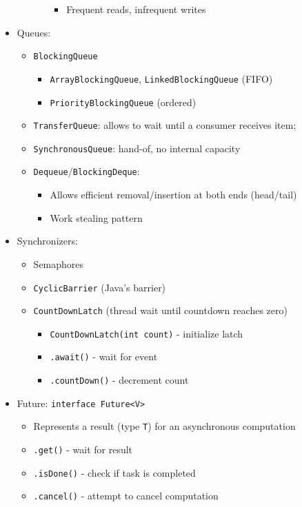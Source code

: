 \documentclass[a4paper]{article}
\newcommand{\inline}[1]{\lstinline!#1!}%
\begin{document}
\begin{itemize}
\begin{itemize}
\begin{itemize}
\begin{itemize}
\item Frequent reads, infrequent writes
\end{itemize}
\end{itemize}
\end{itemize}
\item Queues: 
\begin{itemize}
\item \inline{BlockingQueue}
\begin{itemize}
\item \inline{ArrayBlockingQueue}, \inline{LinkedBlockingQueue} (FIFO)
\item \inline{PriorityBlockingQueue} (ordered)
\end{itemize}
\item \inline{TransferQueue}: allows to wait until a consumer receives item; 
\item \inline{SynchronousQueue}: hand-of, no internal capacity 
\item \inline{Dequeue}/\inline{BlockingDeque}: 
\begin{itemize}
\item Allows efficient removal/insertion at both ends (head/tail)
\item Work stealing pattern
\end{itemize}
\end{itemize}
\item Synchronizers: 
\begin{itemize}
\item Semaphores
\item \inline{CyclicBarrier} (Java's barrier)
\item \inline{CountDownLatch} (thread wait until countdown reaches zero)
\begin{itemize}
\item \inline{CountDownLatch(int count)} - initialize latch
\item \inline{.await()} - wait for event
\item \inline{.countDown()} - decrement count
\end{itemize}
\end{itemize}
\item Future: \inline{interface Future<V>}
\begin{itemize}
\item Represents a result (type \inline{T}) for an asynchronous computation
\item \inline{.get()} - wait for result
\item \inline{.isDone()} - check if task is completed
\item \inline{.cancel()} - attempt to cancel computation
\end{itemize}
\end{itemize}
\end{document}

